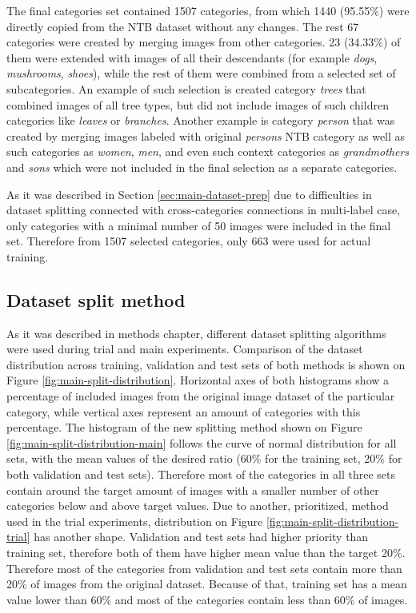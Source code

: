     The final categories set contained 1507 categories, from which 1440 (95.55\%) were directly copied from the NTB dataset without any changes. The rest 67 categories were created by merging images from other categories. 23 (34.33\%) of them were extended with images of all their descendants (for example \textit{dogs}, \textit{mushrooms}, \textit{shoes}), while the rest of them were combined from a selected set of subcategories. An example of such selection is created category \textit{trees} that combined images of all tree types, but did not include images of such children categories like \textit{leaves} or \textit{branches}. Another example is category \textit{person} that was created by merging images labeled with original \textit{persons} NTB category as well as such categories as \textit{women}, \textit{men}, and even such context categories as \textit{grandmothers} and \textit{sons} which were not included in the final selection as a separate categories.
    
    As it was described in Section \ref{sec:main-dataset-prep} due to difficulties in dataset splitting connected with cross-categories connections in multi-label case, only categories with a minimal number of 50 images were included in the final set. Therefore from 1507 selected categories, only 663 were used for actual training.

\subsection{Dataset split method}
    \label{sec:split-comparison}
    As it was described in methods chapter, different dataset splitting algorithms were used during trial and main experiments. Comparison of the dataset distribution across training, validation and test sets of both methods is shown on Figure \ref{fig:main-split-distribution}. Horizontal axes of both histograms show a percentage of included images from the original image dataset of the particular category, while vertical axes represent an amount of categories with this percentage. The histogram of the new splitting method shown on Figure \ref{fig:main-split-distribution-main} follows the curve of normal distribution for all sets, with the mean values of the desired ratio (60\% for the training set, 20\% for both validation and test sets). Therefore most of the categories in all three sets contain around the target amount of images with a smaller number of other categories below and above target values. Due to another, prioritized, method used in the trial experiments, distribution on Figure \ref{fig:main-split-distribution-trial} has another shape. Validation and test sets had higher priority than training set, therefore both of them have higher mean value than the target 20\%. Therefore most of the categories from validation and test sets contain more than 20\% of images from the original dataset. Because of that, training set has a mean value lower than 60\% and most of the categories contain less than 60\% of images.
    
